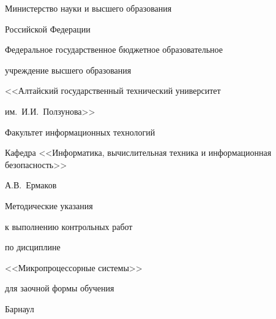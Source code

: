 \documentclass[main.tex]{subfiles}
\begin{document}
\begin{titlepage}
\begin{center}
Министерство науки и высшего образования

Российской Федерации

Федеральное государственное бюджетное образовательное

учреждение высшего образования

<<Алтайский государственный технический университет

им.~И.И.~Ползунова>>

Факультет информационных технологий

Кафедра <<Информатика, вычислительная техника и информационная безопасность>>

\vfill

А.В.~Ермаков

\vspace{12pt}

Методические указания

к выполнению контрольных работ %

по дисциплине

\begin{Large}<<Микропроцессорные системы>>\end{Large}

для заочной формы обучения

\vspace{12pt}


\vfill

Барнаул \the\year
\end{center}
\end{titlepage} 
\end{document}
